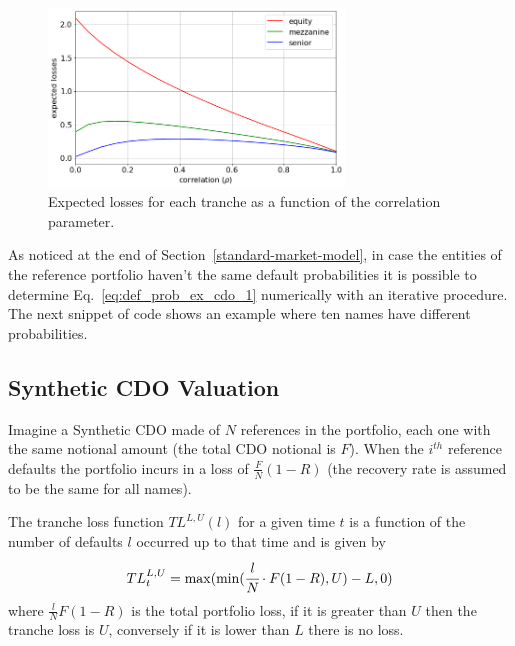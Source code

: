 \begin{figure}[htb]
	\centering
	\includegraphics[width=0.7\textwidth]{figures/losses_vs_rho}
	\caption{Expected losses for each tranche as a function of the correlation parameter.}
	\label{fig:losses_rho}
\end{figure}

\begin{attention}
As noticed at the end of Section~\ref{standard-market-model}, in case the entities of the reference portfolio haven't the same default probabilities it is possible to determine Eq.~\ref{eq:def_prob_ex_cdo_1} numerically with an iterative procedure. The next snippet of code shows an example where ten names have different probabilities.

\begin{ioutput}
[0.5655235318063276, 0.350403844356834, 0.11955743831716371,
 0.0330669128164737, 0.007898678014359, 0.00081191731818153,
 5.350491409986e-05, 2.81423807427e-06, 1.2554827537575e-07,
 5.216612301099e-09, 2.08664492043e-10]
\end{ioutput}
\end{attention}

\subsection{Synthetic CDO Valuation}
Imagine a Synthetic CDO made of $N$ references in the portfolio, each one with the same notional amount (the total CDO notional is $F$).
When the $i^{th}$ reference defaults the portfolio incurs in a loss of $\frac{F}{N}(1-R)$ (the recovery rate is assumed to be the same for all names).

The tranche loss function $TL^{L,U}(l)$ for a given time $t$ is a function of the number of defaults $l$ occurred up to that time and is given by
\begin{equation}
TL_{t}^{L,U}=\mathrm{max}(\mathrm{min}(\cfrac{l}{N}\cdot F(1-R), U)-L, 0)
\end{equation}
where $\frac{l}{N}F(1-R)$ is the total portfolio loss, if it is greater than $U$ then the tranche loss is $U$, conversely if it is lower than $L$ there is no loss.

